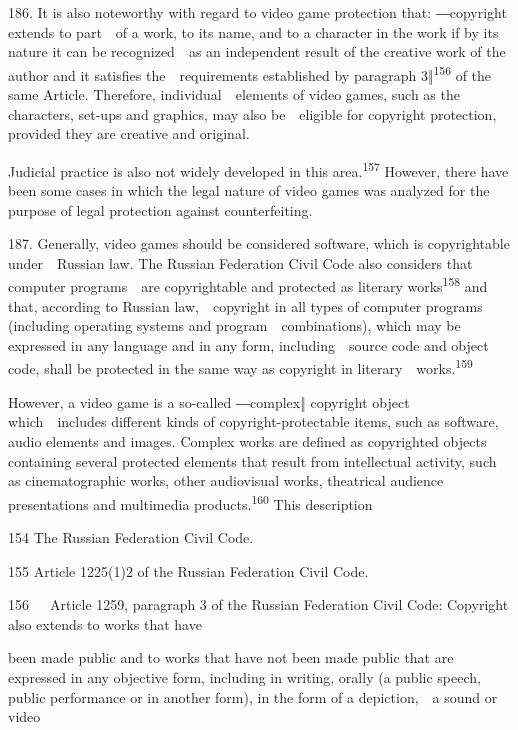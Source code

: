 \documentclass[
]{article}
\begin{document}
{186. }{It is also noteworthy with regard to video }{game protection
that: ―}{copyright extends to part~~of a work, to its name, and to a
character in the work if by its nature it can be recognized~~as an
independent result of the creative work of the author and it satisfies
the~~requirements established by paragraph 3}{‖}\textsuperscript{{156
}}{of the same Article. Therefore, individual~~elements of video games,
such as the characters, set-ups and graphics, may also be~~eligible for
copyright protection, provided they are creative and original.}

{Judicial practice is also not widely developed in this
area.}\textsuperscript{{157 }}{However, there have been some cases in
which the legal nature of video games was analyzed for the purpose of
legal protection against counterfeiting.}

{187. }{Generally, video games should be considered software, which is
copyrightable under~~Russian law. The Russian Federation }{Civil Code
}{also considers that computer programs~~are copyrightable and protected
as literary works}\textsuperscript{{158 }}{and that, according to
Russian law,~~copyright in all types of computer programs (including
operating systems and program~~combinations), which may be expressed in
any language and in any form, including~~source code and object code,
shall be protected in the same way as copyright in
literary~~works.}\textsuperscript{{159}}

{However, a video game is a so-}{called ―complex‖ copyright object
which~~}{includes different kinds of copyright-protectable items, such
as software, audio elements and images. Complex works are defined as
copyrighted objects containing several protected elements that result
from intellectual activity, such as cinematographic works, other
audiovisual works, theatrical audience presentations and multimedia
products.}\textsuperscript{{160 }}{This description}

{154 }{The Russian Federation }{Civil Code}{.}

{155 }{Article 1225(1)2 of the Russian Federation }{Civil Code}{.}

{156}{~~~}{Article 1259, paragraph 3 of the Russian Federation Civil
Code: }{Copyright also extends to works that have}

{been made public and to works that have not been made public that are
expressed in any objective form, including in writing, orally (a public
speech, public performance or in another form), in the form of a
depiction,~~a sound or video}
\end{document}
